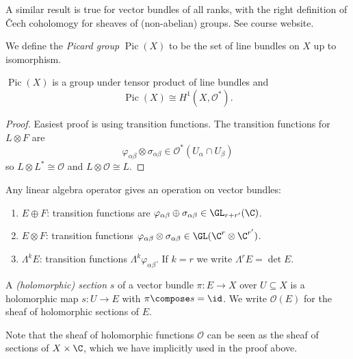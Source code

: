\documentclass[a4paper]{article}
\DeclareMathOperator{\Pic}{Pic} %
\begin{document}
\begin{remark}
  A similar result is true for vector bundles of all ranks, with the right definition of Čech coholomogy for sheaves of (non-abelian) groups. See course website.
\end{remark}

\begin{definition}
  We define the \emph{Picard group} \(\Pic(X)\) to be the set of line bundles on \(X\) up to isomorphism.
\end{definition}

\begin{proposition}
  \(\Pic(X)\) is a group under tensor product of line bundles and
  \[
    \Pic(X) \cong H^1(X, \mathcal O^*).
  \]
\end{proposition}

\begin{proof}
  Easiest proof is using transition functions. The transition functions for \(L \otimes F\) are
  \[
    \varphi_{\alpha\beta} \otimes \sigma_{\alpha\beta} \in \mathcal O^*(U_\alpha \cap U_\beta)
  \]
  so \(L \otimes L^* \cong \mathcal O\) and \(L \otimes \mathcal O \cong L\).
\end{proof}

\begin{eg}
  Any linear algebra operator gives an operation on vector bundles:
  \begin{enumerate}
  \item \(E \oplus F\): transition functions are \(\varphi_{\alpha\beta} \oplus \sigma_{\alpha\beta} \in \GL_{r + r'}(\C)\).
  \item \(E \otimes F\): transition functions \(\varphi_{\alpha\beta} \otimes \sigma_{\alpha\beta} \in \GL(\C^r \otimes \C^{r'})\).
  \item \(\Lambda^kE\): transition functions \(\Lambda^k \varphi_{\alpha\beta}\). If \(k = r\) we write \(\Lambda^r E = \det E\).
  \end{enumerate}
\end{eg}

\begin{definition}[section]
  A \emph{(holomorphic) section} \(s\) of a vector bundle \(\pi: E \to X\) over \(U \subseteq X\) is a holomorphic map \(s: U \to E\) with \(\pi \compose s = \id\). We write \(\mathcal O(E)\) for the sheaf of holomorphic sections of \(E\).
\end{definition}

Note that the sheaf of holomorphic functions \(\mathcal O\) can be seen as the sheaf of sections of \(X \times \C\), which we have implicitly used in the proof above.
\end{document}
